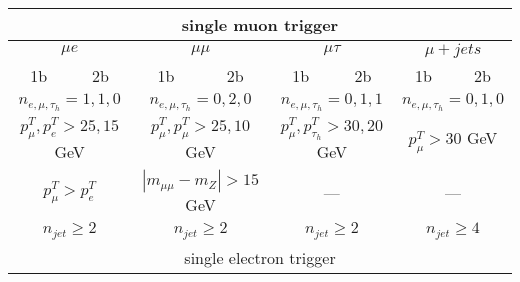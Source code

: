 \begin{table}[ht]
	\centering
	\setlength{\tabcolsep}{0.4em}
    \renewcommand{\arraystretch}{1.5}
    \small
    
    \begin{tabular}{|cc|cc|cc|cc|}
    
    \multicolumn{8}{c}{single muon trigger} \\
    \hline
    \multicolumn{2}{|c|}{$\mu e$} 					& \multicolumn{2}{c|}{$\mu\mu$} 				  & \multicolumn{2}{c|}{$\mu \tau$} 					& \multicolumn{2}{c|}{$\mu + jets$} 			  	\\
    \hline
    1b & 2b                   						& 1b & 2b        	 						      & 1b & 2b        										& 1b & 2b         			        				\\
    \hline 
    \multicolumn{2}{|c|}{$n_{e,\mu,\tau_h} = 1,1,0$}& \multicolumn{2}{c|}{$n_{e,\mu,\tau_h} = 0,2,0$} & \multicolumn{2}{c|}{$n_{e,\mu,\tau_h} = 0,1,1$}      & \multicolumn{2}{c|}{$n_{e,\mu,\tau_h} = 0,1,0$} 	\\
    \multicolumn{2}{|c|}{$p^T_\mu,p^T_e>25,15$ GeV} & \multicolumn{2}{c|}{$p^T_\mu,p^T_\mu>25,10$ GeV}& \multicolumn{2}{c|}{$p^T_\mu,p^T_{\tau_h}>30,20$ GeV}& \multicolumn{2}{c|}{$p^T_\mu>30$ GeV}           	\\
    \multicolumn{2}{|c|}{$p^T_\mu>p^T_e$} 			& \multicolumn{2}{c|}{$|m_{\mu\mu}-m_Z|>15$ GeV } & \multicolumn{2}{c|}{ --- }						     & \multicolumn{2}{c|}{ --- } 						\\
    \multicolumn{2}{|c|}{$n_{jet}\geq2$}			& \multicolumn{2}{c|}{$n_{jet}\geq2$}             &  \multicolumn{2}{c|}{$n_{jet}\geq2$} 				 & \multicolumn{2}{c|}{$n_{jet}\geq4$}             	\\
    \hline

    
    \multicolumn{8}{c}{single electron trigger} \\
    

\end{tabular}
\end{table}
